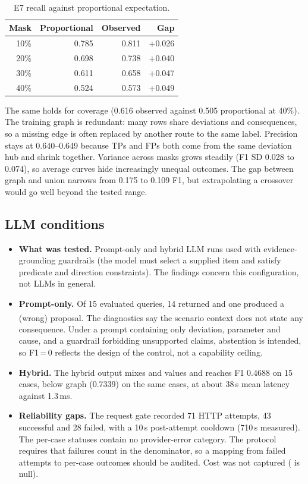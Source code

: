 \documentclass[10pt,twocolumn,a4paper]{extarticle}
\newcommand{\derived}{\textsuperscript{\textdagger}}
\begin{document}
\begin{table}[t]
\centering
\caption{E7 recall against proportional expectation\derived{}.}
\label{tab:prop}
\begin{tabular}{@{}r r r r@{}}
\toprule
\textbf{Mask} & \textbf{Proportional} & \textbf{Observed} & \textbf{Gap}\\
\midrule
10\% & 0.785 & 0.811 & +0.026\\
20\% & 0.698 & 0.738 & +0.040\\
30\% & 0.611 & 0.658 & +0.047\\
40\% & 0.524 & 0.573 & +0.049\\
\bottomrule
\end{tabular}
\end{table}
The same holds for coverage (0.616 observed against 0.505 proportional at 40\%). The training graph is redundant: many rows share deviations and consequences, so a missing edge is often replaced by another route to the same label. Precision stays at 0.640--0.649 because TPs and FPs both come from the same deviation hub and shrink together. Variance across masks grows steadily (F1 SD 0.028 to 0.074), so average curves hide increasingly unequal outcomes. The gap between graph and union narrows from 0.175 to 0.109 F1, but extrapolating a crossover would go well beyond the tested range.

\subsection{LLM conditions}\label{sec:llm}
\begin{itemize}
  \item \textbf{What was tested.} Prompt-only and hybrid LLM runs used  with evidence-grounding guardrails (the model must select a supplied item and satisfy predicate and direction constraints). The findings concern this configuration, not LLMs in general.
  \item \textbf{Prompt-only.} Of 15 evaluated queries, 14 returned  and one produced a (wrong) proposal.\derived{} The diagnostics say the scenario context does not state any consequence. Under a prompt containing only deviation, parameter and cause, and a guardrail forbidding unsupported claims, abstention is intended, so F1\,=\,0 reflects the design of the control, not a capability ceiling.
  \item \textbf{Hybrid.} The hybrid output mixes  and  values and reaches F1 0.4688 on 15 cases, below graph (0.7339) on the same cases, at about 38\,s mean latency against 1.3\,ms.
  \item \textbf{Reliability gaps.} The request gate recorded 71 HTTP attempts, 43 successful and 28 failed, with a 10\,s post-attempt cooldown (710\,s measured). The per-case statuses contain no provider-error category. The protocol requires that failures count in the denominator, so a mapping from failed attempts to per-case outcomes should be audited. Cost was not captured ( is null).
\end{itemize}
\end{document}
